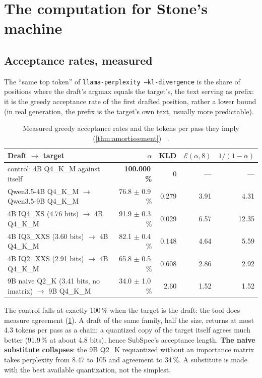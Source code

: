 \section{The computation for Stone's machine}\label{sec:spec-machine}

\subsection{Acceptance rates, measured}\label{sec:alpha}

The \enquote{same top token} of \texttt{llama-perplexity --kl-divergence} is the share of positions where the draft's argmax equals the target's, the text serving as prefix: it is the greedy acceptance rate of the first drafted position, rather a lower bound (in real generation, the prefix is the target's own text, usually more predictable).

\begin{table}[ht]
\centering\small
\caption[Measured greedy acceptance rates]{Measured greedy acceptance rates and the tokens per pass they imply (\cref{thm:amortissement}) \mes~\calc.}
\label{tab:alpha}
\begin{tabular}{@{}lrrrr@{}}
\toprule
Draft $\to$ target & $\alpha$ & KLD & $\mathcal E(\alpha,8)$ & $1/(1-\alpha)$ \\
\midrule
control: 4B Q4\_K\_M against itself & \textbf{100.000\,\%} & 0 & --- & --- \\
Qwen3.5-4B Q4\_K\_M $\to$ Qwen3.5-9B Q4\_K\_M & 76.8 $\pm$ 0.9\,\% & 0.279 & 3.91 & 4.31 \\
4B IQ4\_XS (4.76 bits) $\to$ 4B Q4\_K\_M & 91.9 $\pm$ 0.3\,\% & 0.029 & 6.57 & 12.35 \\
4B IQ3\_XXS (3.60 bits) $\to$ 4B Q4\_K\_M & 82.1 $\pm$ 0.4\,\% & 0.148 & 4.64 & 5.59 \\
4B IQ2\_XXS (2.91 bits) $\to$ 4B Q4\_K\_M & 65.8 $\pm$ 0.5\,\% & 0.608 & 2.86 & 2.92 \\
9B naive Q2\_K (3.41 bits, no imatrix) $\to$ 9B Q4\_K\_M & 34.0 $\pm$ 1.0\,\% & 2.60 & 1.52 & 1.52 \\
\bottomrule
\end{tabular}
\end{table}

The control falls at exactly 100\,\% when the target is the draft: the tool does measure agreement (\cref{tab:alpha}). A draft of the same family, half the size, returns at most 4.3 tokens per pass as a chain; a quantized copy of the target itself agrees much better (91.9\,\% at about 4.8 bits), hence SubSpec's acceptance length. \textbf{The naive substitute collapses}: the 9B Q2\_K requantized without an importance matrix takes perplexity from 8.47 to 105 and agreement to 34\,\%. A substitute is made with the best available quantization, not the simplest.

